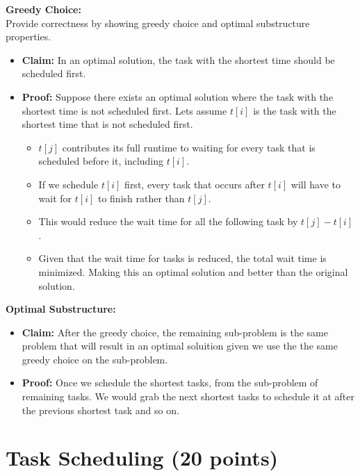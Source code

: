 \documentclass{article}[12pt]
\begin{document}
\noindent\textbf{Greedy Choice:} \\

  Provide correctness by showing greedy choice and optimal substructure properties.
    \begin{itemize}
      \item \textbf{Claim:} In an optimal solution, the task with the shortest time should be scheduled first.
      \item \textbf{Proof:} Suppose there exists an optimal solution where the task with the shortest time is not scheduled first.
        Lets assume $t[i]$ is the task with the shortest time that is not scheduled first.
        \begin{itemize}
          \item $t[j]$ contributes its full runtime to waiting for every task that is scheduled before it, including $t[i]$.
          \item If we schedule $t[i]$ first, every task that occurs after $t[i]$ 
            will have to wait for $t[i]$ to finish rather than $t[j]$.
          \item This would reduce the wait time for all the following task by $t[j] - t[i]$.
          \item Given that the wait time for tasks is reduced, the total wait time is minimized. Making this an optimal solution and better
            than the original solution.
        \end{itemize}
    \end{itemize}

\noindent\textbf{Optimal Substructure:} \\
\begin{itemize}
  \item \textbf{Claim:} After the greedy choice, the remaining sub-problem is the 
    same problem that will result in an optimal soluition given we use the the same greedy choice on the sub-problem.
  \item \textbf{Proof:} Once we schedule the shortest tasks, from the sub-problem of remaining tasks.
    We would grab the next shortest tasks to schedule it at after the previous shortest task and so on.
\end{itemize}

\newpage
\section{Task Scheduling (20 points)}
\end{document}
